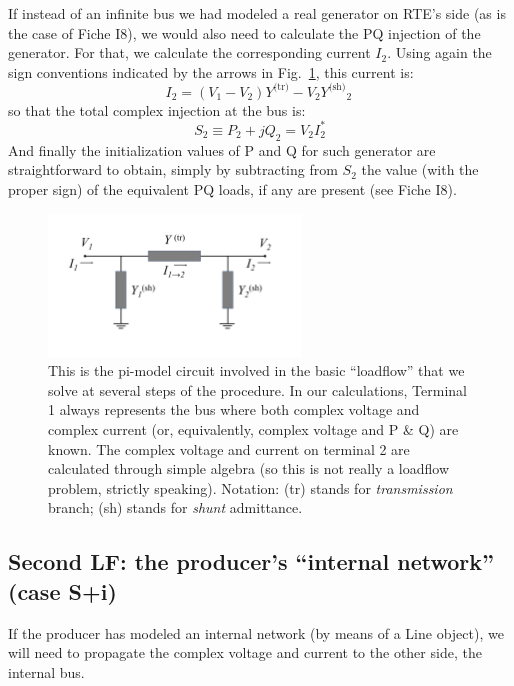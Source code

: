 \documentclass[a4paper,11pt]{article}
\newcommand{\Ytr}{\ensuremath{Y^{\textrm{(tr)}}}}
\newcommand{\Ysh}{\ensuremath{Y^{\textrm{(sh)}}}}
\begin{document}
If instead of an infinite bus we had modeled a real generator on RTE's side (as is the
case of Fiche I8), we would also need to calculate the PQ injection of the
generator. For that, we calculate the corresponding current $I_2$. Using again the sign
conventions indicated by the arrows in Fig.~\ref{fig:pimodel_LF}, this current is:
\begin{equation}
  I_2 = ( V_1 - V_2 ) \Ytr - V_2 \Ysh_2 \,
  \label{eq:complex_I}
\end{equation}
so that the total complex injection at the bus is:
\begin{equation}
  S_2 \equiv P_2 + j Q_2 = V_2 I_2^*
  \label{eq:complex_S}
\end{equation}
And finally the initialization values of P and Q for such generator are straightforward
to obtain, simply by subtracting from $S_2$ the value (with the proper sign) of the
equivalent PQ loads, if any are present (see Fiche I8).


\begin{figure}
  \centering
  \includegraphics[width=0.6\textwidth]{pi_model_circuit}
  \caption{This is the pi-model circuit involved in the basic ``loadflow'' that we solve
    at several steps of the procedure. In our calculations, Terminal 1 always represents
    the bus where both complex voltage and complex current (or, equivalently, complex
    voltage and P \& Q) are known. The complex voltage and current on terminal 2 are
    calculated through simple algebra (so this is not really a loadflow problem,
    strictly speaking). Notation: (tr) stands for \emph{transmission} branch; (sh)
    stands for \emph{shunt} admittance.}
  \label{fig:pimodel_LF}
\end{figure}



\subsection{Second LF: the producer's ``internal network'' (case S+i)}

If the producer has modeled an internal network (by means of a Line object), we will
need to propagate the complex voltage and current to the other side, the internal bus.
\end{document}

